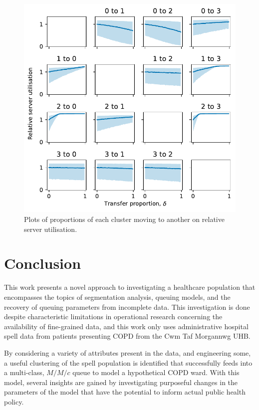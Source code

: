 \documentclass[11pt]{article}
\newlength{\imgwidth}
\begin{document}
\begin{figure}
    \centering
    \includegraphics[width=\imgwidth]{img_moving_util}
    \caption{%
        Plots of proportions of each cluster moving to another on relative
        server utilisation.
    }\label{fig:moving_util}
\end{figure}

\section{Conclusion}\label{sec:conclusion}

This work presents a novel approach to investigating a healthcare population
that encompasses the topics of segmentation analysis, queuing models, and the
recovery of queuing parameters from incomplete data. This investigation is done
despite characteristic limitations in operational research concerning the
availability of fine-grained data, and this work only uses administrative
hospital spell data from patients presenting COPD from the Cwm Taf Morgannwg
UHB.\

By considering a variety of attributes present in the data, and engineering
some, a useful clustering of the spell population is identified that
successfully feeds into a multi-class, \(M/M/c\) queue to model a hypothetical
COPD ward. With this model, several insights are gained by investigating
purposeful changes in the parameters of the model that have the potential to
inform actual public health policy. 
\end{document}
